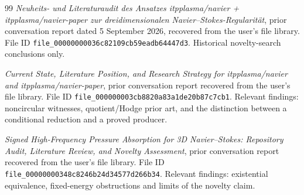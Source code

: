 \documentclass[11pt,a4paper]{article}
\theoremstyle{definition}
\theoremstyle{remark}
\newcommand{\repo}[1]{{\small\texttt{#1}}}
\numberwithin{equation}{section}
\begin{document}
\begin{thebibliography}{99}
\emph{Neuheits- und Literaturaudit des Ansatzes itpplasma/navier + itpplasma/navier-paper zur dreidimensionalen Navier--Stokes-Regularit\"at}, prior conversation report dated 5 September 2026, recovered from the user's file library. File ID \repo{file\_00000000036c82109cb59eadb64447d3}. Historical novelty-search conclusions only.

\emph{Current State, Literature Position, and Research Strategy for itpplasma/navier and itpplasma/navier-paper}, prior conversation report recovered from the user's file library. File ID \repo{file\_000000003cb8820a83a1de20b87c7cb1}. Relevant findings: noncircular witnesses, quotient/Hodge prior art, and the distinction between a conditional reduction and a proved producer.

\emph{Signed High-Frequency Pressure Absorption for 3D Navier--Stokes: Repository Audit, Literature Review, and Novelty Assessment}, prior conversation report recovered from the user's file library. File ID \repo{file\_00000000348c8246b24d34577d266b34}. Relevant findings: existential equivalence, fixed-energy obstructions and limits of the novelty claim.

\end{thebibliography}
\endgroup
\end{document}
